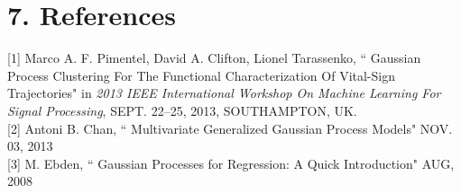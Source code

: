 \documentclass[letterpaper]{article}
\begin{document}
\section{7.  References}

[1] Marco A. F. Pimentel, David A. Clifton, Lionel Tarassenko, `` Gaussian Process Clustering For The Functional Characterization Of Vital-Sign Trajectories"
 in {\it 2013 IEEE International Workshop On Machine Learning For Signal Processing}, SEPT. 22–25, 2013, SOUTHAMPTON, UK. \\

[2] Antoni B. Chan, ``{ Multivariate Generalized Gaussian Process Models}" NOV. 03, 2013 \\

[3] M. Ebden, ``{ Gaussian Processes for Regression: A Quick Introduction}" AUG, 2008 \\
\end{document}
